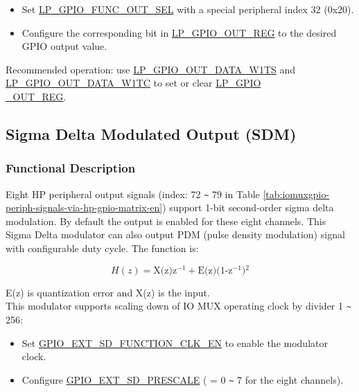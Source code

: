 \documentclass[main\_\_EN.tex]{subfiles}
\begin{document}
\begin{itemize}
    \item Set \hyperref[fielddesc:LPGPIOFUNCNOUTSEL]{LP\_GPIO\_FUNC\_OUT\_SEL} with a special peripheral index 32 (0x20).

    \item Configure the corresponding bit in \hyperref[regdesc:LPGPIOOUTREG]{LP\_GPIO\_OUT\_REG} to the desired GPIO output value.
\end{itemize}
\begin{tiplisting}
Recommended operation: use \hyperref[fielddesc:LPGPIOOUTDATAW1TS]{LP\_GPIO\_OUT\_DATA\_W1TS} and \hyperref[fielddesc:LPGPIOOUTDATAW1TC]{LP\_GPIO\_OUT\_DATA\_W1TC} to set or clear \hyperref[regdesc:LPGPIOOUTREG]{LP\_GPIO\\\_OUT\_REG}.
\end{tiplisting}

\subsection{Sigma Delta Modulated Output (SDM)}

\subsubsection{Functional Description}

Eight HP peripheral output signals (index: 72 \verb+~+ 79 in Table \ref{tab:iomuxgpio-periph-signals-via-hp-gpio-matrix-en}) support 1-bit second-order sigma delta modulation. By default the output is enabled for these eight channels. This Sigma Delta modulator can also output PDM (pulse density modulation) signal with configurable duty cycle. The function is:

\[
    H(z)=\textrm{X(z)z$^{-1}$} + \textrm{E(z)(1-z$^{-1}$)$^{2}$}
    \]

E(z) is quantization error and X(z) is the input.\\
This modulator supports scaling down of IO MUX operating clock by divider 1 \verb+~+ 256:
\begin{itemize}
    \item Set  \hyperref[fielddesc:GPIOSDFUNCTIONCLKEN]{GPIO\_EXT\_SD\_FUNCTION\_CLK\_EN} to enable the modulator clock.
    \item Configure \hyperref[fielddesc:GPIOSDSDNPRESCALE]{GPIO\_EXT\_SD\_PRESCALE} ( = 0 \verb+~+ 7 for the eight channels).
\end{itemize}
\end{document}
